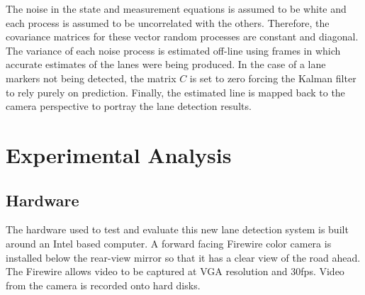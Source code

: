 \documentclass{article}
\begin{document}
The noise in the state and measurement equations is assumed to be white
and each process is assumed to be uncorrelated with the others.
Therefore, the covariance matrices for these vector random processes are
constant and diagonal. The variance of each noise process is estimated
 off-line using frames in which accurate estimates
of the lanes were being produced.
In the case of a lane markers not being detected, the matrix $C$ is set to zero
forcing the Kalman filter to rely purely on prediction. Finally, the estimated line is mapped back to the camera perspective to portray the lane detection results.

\section{Experimental Analysis}
\label{sec:exp_ana}
\subsection{Hardware}
The hardware used to test and evaluate this new lane detection system is built around an Intel based computer.  A forward facing Firewire color camera is installed below the rear-view mirror so that it has a clear view of the road ahead. The Firewire allows video to be captured at VGA resolution and 30fps.
Video from the camera is recorded onto hard disks.
\end{document}
